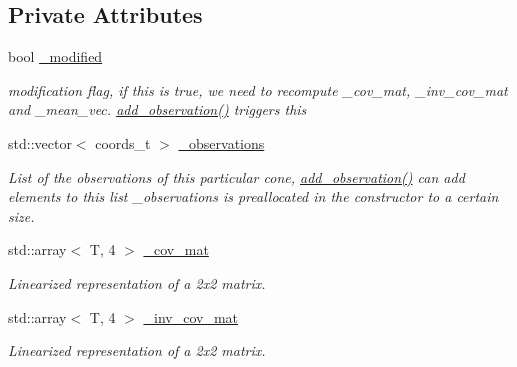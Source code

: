 \subsection*{Private Attributes}
\begin{DoxyCompactItemize}
\item 
\mbox{\label{classclara_1_1cone__state_a0e08ed1150f22d7edffbcb2152cf4d29}} 
bool \hyperlink{classclara_1_1cone__state_a0e08ed1150f22d7edffbcb2152cf4d29}{\+\_\+modified}
\begin{DoxyCompactList}\small\item\em modification flag, if this is true, we need to recompute {\ttfamily \+\_\+cov\+\_\+mat}, {\ttfamily \+\_\+inv\+\_\+cov\+\_\+mat} and {\ttfamily \+\_\+mean\+\_\+vec}. {\ttfamily \hyperlink{classclara_1_1cone__state_a7cd7364ca787c25b0ca333d0cb1c3081}{add\+\_\+observation()}} triggers this \end{DoxyCompactList}\item 
std\+::vector$<$ coords\+\_\+t $>$ \hyperlink{classclara_1_1cone__state_ae5c8c1ba05533a80ab1874fb878888b9}{\+\_\+observations}
\begin{DoxyCompactList}\small\item\em List of the observations of this particular cone, {\ttfamily \hyperlink{classclara_1_1cone__state_a7cd7364ca787c25b0ca333d0cb1c3081}{add\+\_\+observation()}} can add elements to this list {\ttfamily \+\_\+observations} is preallocated in the constructor to a certain size. \end{DoxyCompactList}\item 
std\+::array$<$ T, 4 $>$ \hyperlink{classclara_1_1cone__state_a2a5e7dc2078a6d5ef80b1bac25354e2f}{\+\_\+cov\+\_\+mat}
\begin{DoxyCompactList}\small\item\em Linearized representation of a 2x2 matrix. \end{DoxyCompactList}\item 
std\+::array$<$ T, 4 $>$ \hyperlink{classclara_1_1cone__state_af36bb866c831dfc5b7b199d6434511f4}{\+\_\+inv\+\_\+cov\+\_\+mat}
\begin{DoxyCompactList}\small\item\em Linearized representation of a 2x2 matrix. \end{DoxyCompactList}\item 
\mbox{\label{classclara_1_1cone__state_aa42f4654a82f825dc3b89d4ec0b03deb}} 

\end{DoxyCompactItemize}
